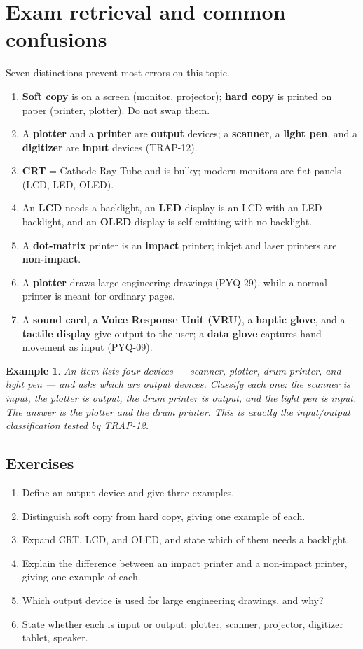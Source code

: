 \documentclass[11pt]{article}
\newtheorem{example}{Example}[section]
\begin{document}
\section{Exam retrieval and common confusions}
Seven distinctions prevent most errors on this topic.
\begin{enumerate}
  \item \textbf{Soft copy} is on a screen (monitor, projector); \textbf{hard
    copy} is printed on paper (printer, plotter). Do not swap them.
  \item A \textbf{plotter} and a \textbf{printer} are \textbf{output} devices;
    a \textbf{scanner}, a \textbf{light pen}, and a \textbf{digitizer} are
    \textbf{input} devices (TRAP-12).
  \item \textbf{CRT} = Cathode Ray Tube and is bulky; modern monitors are flat
    panels (LCD, LED, OLED).
  \item An \textbf{LCD} needs a backlight, an \textbf{LED} display is an LCD
    with an LED backlight, and an \textbf{OLED} display is self-emitting with
    no backlight.
  \item A \textbf{dot-matrix} printer is an \textbf{impact} printer; inkjet
    and laser printers are \textbf{non-impact}.
  \item A \textbf{plotter} draws large engineering drawings (PYQ-29), while a
    normal printer is meant for ordinary pages.
  \item A \textbf{sound card}, a \textbf{Voice Response Unit (VRU)}, a
    \textbf{haptic glove}, and a \textbf{tactile display} give output to the
    user; a \textbf{data glove} captures hand movement as input (PYQ-09).
\end{enumerate}

\begin{example}
An item lists four devices --- scanner, plotter, drum printer, and light pen
--- and asks which are output devices. Classify each one: the scanner is
input, the plotter is output, the drum printer is output, and the light pen is
input. The answer is the plotter and the drum printer. This is exactly the
input/output classification tested by TRAP-12.
\end{example}

\subsection*{Exercises}
\begin{enumerate}[label=\arabic*.]
  \item Define an output device and give three examples.
  \item Distinguish soft copy from hard copy, giving one example of each.
  \item Expand CRT, LCD, and OLED, and state which of them needs a backlight.
  \item Explain the difference between an impact printer and a non-impact
    printer, giving one example of each.
  \item Which output device is used for large engineering drawings, and why?
  \item State whether each is input or output: plotter, scanner, projector,
    digitizer tablet, speaker.
\end{enumerate}
\end{document}
